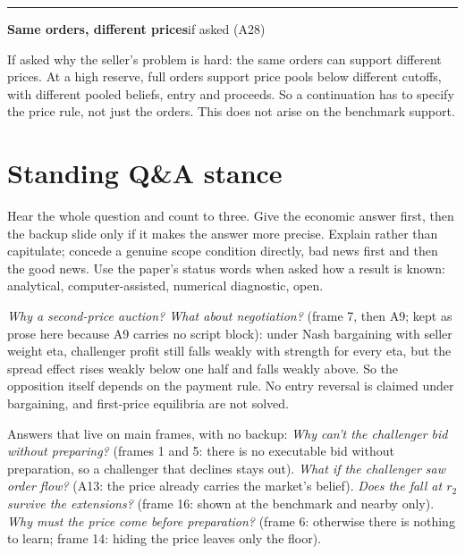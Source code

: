\documentclass[11pt]{article}
\newcommand{\scriptframe}[3]{%
  \Needspace{9\baselineskip}%
  \par\medskip\noindent\textcolor{ScriptBlue}{\rule{\linewidth}{0.55pt}}%
  \par\smallskip\noindent
  \textbf{#1}\hfill\textcolor{ScriptGray}{\small #2}\par\smallskip
  #3\par}
\begin{document}
\scriptframe{Same orders, different prices}{if asked (A28)}{%
  If asked why the seller's problem is hard: the same orders can support
  different prices. At a high reserve, full orders support price pools below
  different cutoffs, with different pooled beliefs, entry and proceeds. So a
  continuation has to specify the price rule, not just the orders. This does not
  arise on the benchmark support.
}

\section*{Standing Q\&A stance}
Hear the whole question and count to three. Give the economic answer first,
then the backup slide only if it makes the answer more precise. Explain rather
than capitulate; concede a genuine scope condition directly, bad news first and
then the good news. Use the paper's status words when asked how a result is
known: analytical, computer-assisted, numerical diagnostic, open.

\textit{Why a second-price auction? What about negotiation?} (frame 7, then A9;
kept as prose here because A9 carries no script block): under Nash bargaining
with seller weight eta, challenger profit still falls weakly with strength for
every eta, but the spread effect rises weakly below one half and falls weakly
above. So the opposition itself depends on the payment rule. No entry reversal
is claimed under bargaining, and first-price equilibria are not solved.

Answers that live on main frames, with no backup: \textit{Why can't the challenger
bid without preparing?} (frames 1 and 5: there is no executable bid without
preparation, so a challenger that declines stays out). \textit{What if the
challenger saw order flow?} (A13: the price already carries the market's belief).
\textit{Does the fall at $r_2$ survive the extensions?} (frame 16: shown at the
benchmark and nearby only). \textit{Why must the price come before preparation?}
(frame 6: otherwise there is nothing to learn; frame 14: hiding the price leaves
only the floor).
\end{document}

